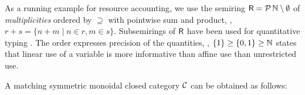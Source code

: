 \documentclass[acmsmall,review,anonymous]{acmart}\settopmatter{printfolios=true,printccs=false,printacmref=false}
\theoremstyle{remark}
\begin{document}
As a running example for resource accounting,
we use the semiring $\mathsf{R} = \mathcal{P}\,\mathbb{N} \setminus \emptyset$ of
\emph{multiplicities} ordered by $\supseteq$ with pointwise sum and
product, \eg, $r + s = \{ n + m \mid n \in r, m \in s \}$.
Subsemirings of $\mathsf{R}$ have been used for quantitative typing
\cite{sergeyVytiniotisPeytonJones:popl14,mcBride:wadler60,atkey:lics18}.
The order expresses precision of the quantities, \eg,
$\{1\} \geq \{0,1\} \geq \mathbb{N}$ states that linear use of a variable is more informative than affine use than unrestricted use.

A matching symmetric monoidal closed category $\mathcal{C}$ can be obtained as
follows:
%
\end{document}

